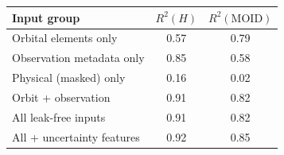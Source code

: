 \begin{tabular}{lcc}
\toprule
Input group & $R^2(H)$ & $R^2(\mathrm{MOID})$\\
\midrule
Orbital elements only & 0.57 & 0.79\\
Observation metadata only & 0.85 & 0.58\\
Physical (masked) only & 0.16 & 0.02\\
Orbit + observation & 0.91 & 0.82\\
All leak-free inputs & 0.91 & 0.82\\
All + uncertainty features & 0.92 & 0.85\\
\bottomrule
\end{tabular}
